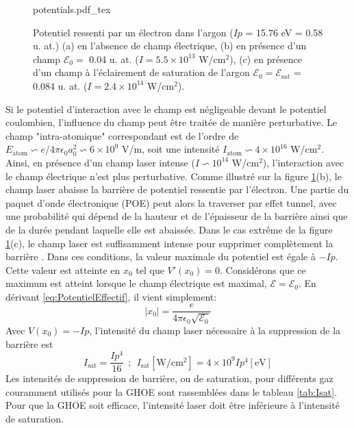 \begin{figure}
\centering
\def\svgwidth{\columnwidth}
{potentials.pdf_tex}
\caption{Potentiel ressenti par un électron dans l'argon ($Ip$ = 15.76 eV = 0.58 u. at.) (a) en l'absence de champ électrique, (b) en présence d'un champ $\mathcal{E}_0 =$ 0.04 u. at. ($I = 5.5 \times 10^{13}$ W/cm$^2$), (c) en présence d'un champ à l'éclairement de saturation de l'argon $\mathcal{E}_0 = \mathcal{E}_{\text{sat}}$ = 0.084 u. at. ($I = 2.4 \times 10^{14}$ W/cm$^2$).}
\label{fig:potentials}
\end{figure}

Si le potentiel d'interaction avec le champ est négligeable devant le potentiel coulombien, l'influence du champ peut être traitée de manière perturbative. Le champ "intra-atomique" correspondant est de l'ordre de $E_{\text{atom}} \backsim e/4\pi \epsilon_0 a_0^2 \backsim 6 \times 10^9$ V/m, soit une intensité $I_\text{atom} \backsim 4 \times 10^{16}$ W/cm$^2$. Ainsi, en présence d'un champ laser intense ($I \backsim 10^{14}$ W/cm$^2$), l'interaction avec le champ électrique n'est plus perturbative. Comme illustré sur la figure \ref{fig:potentials}(b), le champ laser abaisse la barrière de potentiel ressentie par l'électron. Une partie du paquet d'onde électronique (POE) peut alors la traverser par effet tunnel, avec une probabilité qui dépend de la hauteur et de l'épaisseur de la barrière ainsi que de la durée pendant laquelle elle est abaissée. Dans le cas extrême de la figure \ref{fig:potentials}(c), le champ laser est suffisamment intense pour supprimer complètement la barrière . Dans ces conditions, la valeur maximale du potentiel est égale à $-Ip$. Cette valeur est atteinte en $x_0$ tel que $V'(x_0) = 0$. Considérons que ce maximum est atteint lorsque le champ électrique est maximal, $\mathcal{E} = \mathcal{E}_0$. En dérivant \ref{eq:PotentielEffectif}, il vient simplement:
\begin{equation}
|x_0| = \frac{e}{4\pi \epsilon_0 \sqrt{\mathcal{E}_0}}
\end{equation}
Avec $V(x_0) = - Ip$, l'intensité du champ laser nécessaire à la suppression de la barrière est 
\begin{equation}
I_{\text{sat}} = \frac{Ip^4}{16} \: \: ; \: \: I_{\text{sat}} [\text{W/cm$^2$}] = 4 \times 10^9 Ip^4 [\text{eV}]
\end{equation}
Les intensités de suppression de barrière, ou de saturation, pour différents gaz couramment utilisés pour la GHOE sont rassemblées dans le tableau \ref{tab:Isat}. Pour que la GHOE soit efficace, l'intensité laser doit être inférieure à l'intensité de saturation. 

